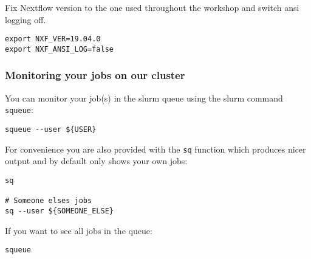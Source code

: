 Fix Nextflow version to the one used throughout the workshop and switch ansi logging off.

\begin{steps}
\begin{lstlisting}
export NXF_VER=19.04.0
export NXF_ANSI_LOG=false
\end{lstlisting}
\end{steps}

\subsubsection{Monitoring your jobs on our cluster}

\begin{note}
You can monitor your job(s) in the slurm queue using the slurm command \texttt{squeue}:

\begin{lstlisting}
squeue --user ${USER}
\end{lstlisting}

For convenience you are also provided with the \texttt{sq} function which produces nicer output and by default only shows your own jobs:

\begin{lstlisting}
sq

# Someone elses jobs
sq --user ${SOMEONE_ELSE}
\end{lstlisting}

If you want to see all jobs in the queue:

\begin{lstlisting}
squeue
\end{lstlisting}

\end{note}

